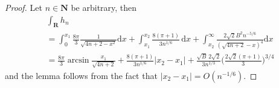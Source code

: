 \documentclass[10pt,a4paper]{amsart}
\renewcommand{\mathbb}{\mathbf}
\begin{document}
\begin{proof}
    Let $n\in \mathbb{N}$ be arbitrary, then
    \begin{align*}
        &\int_\mathbb{R}h_n \\
        &= \int_{0}^{x_1} \frac{8\pi}{3}\frac{1}{\sqrt{4n+2-x^2}}\mathrm{d}x + \int_{x_1}^{x_2} \frac{8(\pi+1)}{3n^{1/6}} \,\mathrm{d}x + \int_{x_2}^\infty \frac{2\sqrt{2}B^2n^{-5/6}}{(\sqrt{4n+2}-x)^4}\mathrm{d}x \\
        &= \frac{8\pi}{3}\arcsin{\frac{x_1}{\sqrt{4n+2}}} + \frac{8(\pi+1)}{3n^{1/6}}|x_2-x_1|+ \frac{\sqrt{B}\,2\sqrt{2}}{3n^{1/3}}\bigg(\frac{2\sqrt{2}(\pi+1)}{3}\bigg)^{3/4}
    \end{align*}
    and the lemma follows from the fact that $|x_2-x_1|=O(n^{-1/6})$.
\end{proof}
\end{document}
